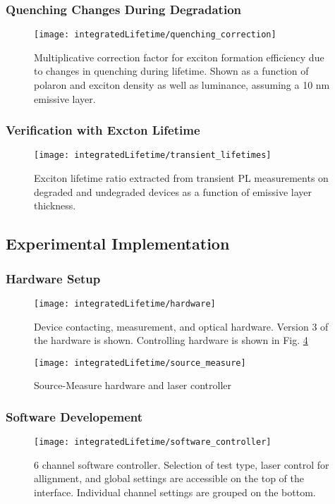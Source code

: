 \documentclass[../thesis.tex]{subfiles}
\begin{document}
\subsubsection{Quenching Changes During Degradation}
\begin{figure}[h]
\centering
\texttt{[image: integratedLifetime/quenching\_correction]}
\caption{Multiplicative correction factor for exciton formation efficiency due to changes in quenching during lifetime.  Shown as a function of polaron and exciton density as well as luminance, assuming a 10 nm emissive layer.}
\label{fig:quenching_correction}
\end{figure}
\subsubsection{Verification with Excton Lifetime}
\begin{figure}[h]
\centering
\texttt{[image: integratedLifetime/transient\_lifetimes]}
\caption{Exciton lifetime ratio extracted from transient PL measurements on degraded and undegraded devices as a function of emissive layer thickness.}
\label{fig:transient_lifetimes}
\end{figure}

\subsection{Experimental Implementation}
\subsubsection{Hardware Setup}
\begin{figure}[h]
\centering
\texttt{[image: integratedLifetime/hardware]}
\caption{Device contacting, measurement, and optical hardware.  Version 3 of the hardware is shown.  Controlling hardware is shown in Fig. \ref{fig:source_measure}}
\label{fig:hardware}
\end{figure}

\begin{figure}[h]
\centering
\texttt{[image: integratedLifetime/source\_measure]}
\caption{Source-Measure hardware and laser controller}
\label{fig:source_measure}
\end{figure}

\subsubsection{Software Developement}

\begin{figure}[h]
    \centering
    \texttt{[image: integratedLifetime/software\_controller]}
\caption{6 channel software controller.  Selection of test type, laser control for allignment, and global settings are accessible on the top of the interface.  Individual channel settings are grouped on the bottom.}
\label{fig:software_controller}
\end{figure}
\end{document}
